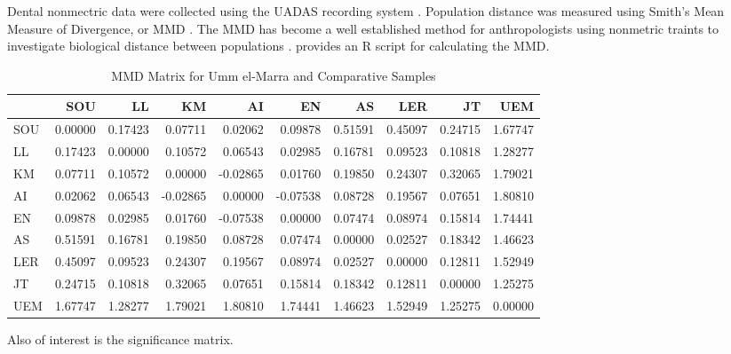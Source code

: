 \documentclass[]{book}
\begin{document}
Dental nonmectric data were collected using the UADAS recording system
\citep{scott2000anthteeth}. Population distance was measured using
Smith's Mean Measure of Divergence, or MMD \citep{smith1977note}. The
MMD has become a well established method for anthropologists using
nonmetric traints to investigate biological distance between populations
\citep{harris2004calculation}. \citet{soltysiak2011mmd} provides an R
script for calculating the MMD.

\begin{table}

\caption{\label{tab:unnamed-chunk-4}MMD Matrix for Umm el-Marra and Comparative Samples}
\centering
\begin{tabular}[t]{l|r|r|r|r|r|r|r|r|r}
\hline
  & SOU & LL & KM & AI & EN & AS & LER & JT & UEM\\
\hline
SOU & 0.00000 & 0.17423 & 0.07711 & 0.02062 & 0.09878 & 0.51591 & 0.45097 & 0.24715 & 1.67747\\
\hline
LL & 0.17423 & 0.00000 & 0.10572 & 0.06543 & 0.02985 & 0.16781 & 0.09523 & 0.10818 & 1.28277\\
\hline
KM & 0.07711 & 0.10572 & 0.00000 & -0.02865 & 0.01760 & 0.19850 & 0.24307 & 0.32065 & 1.79021\\
\hline
AI & 0.02062 & 0.06543 & -0.02865 & 0.00000 & -0.07538 & 0.08728 & 0.19567 & 0.07651 & 1.80810\\
\hline
EN & 0.09878 & 0.02985 & 0.01760 & -0.07538 & 0.00000 & 0.07474 & 0.08974 & 0.15814 & 1.74441\\
\hline
AS & 0.51591 & 0.16781 & 0.19850 & 0.08728 & 0.07474 & 0.00000 & 0.02527 & 0.18342 & 1.46623\\
\hline
LER & 0.45097 & 0.09523 & 0.24307 & 0.19567 & 0.08974 & 0.02527 & 0.00000 & 0.12811 & 1.52949\\
\hline
JT & 0.24715 & 0.10818 & 0.32065 & 0.07651 & 0.15814 & 0.18342 & 0.12811 & 0.00000 & 1.25275\\
\hline
UEM & 1.67747 & 1.28277 & 1.79021 & 1.80810 & 1.74441 & 1.46623 & 1.52949 & 1.25275 & 0.00000\\
\hline
\end{tabular}
\end{table}

Also of interest is the significance matrix.
\end{document}
